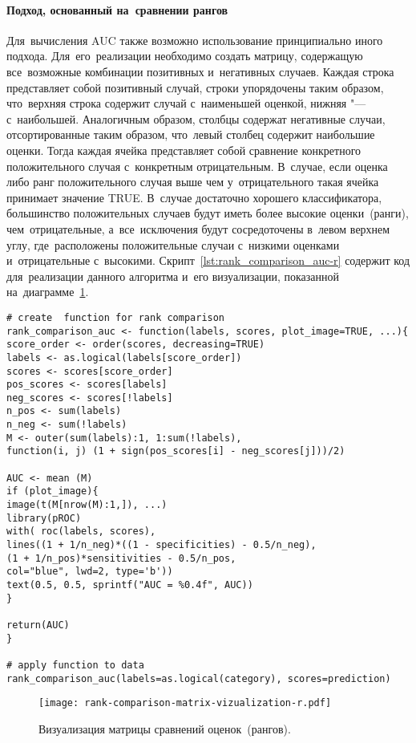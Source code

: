 \documentclass[]{scrreprt}
\begin{document}
\paragraph{Подход, основанный на~сравнении рангов}
Для~вычисления AUC также возможно использование принципиально иного подхода. Для~его~реализации необходимо создать матрицу, содержащую все~возможные комбинации позитивных и~негативных случаев. Каждая строка представляет собой позитивный случай, строки упорядочены таким образом, что~верхняя строка содержит случай с~наименьшей оценкой, нижняя "--- с~наибольшей. Аналогичным образом, столбцы содержат негативные случаи, отсортированные таким образом, что~левый столбец содержит наибольшие оценки. Тогда каждая ячейка представляет собой сравнение конкретного положительного случая с~конкретным отрицательным. В~случае, если оценка либо ранг положительного случая выше чем у~отрицательного такая ячейка принимает значение TRUE. В~случае достаточно хорошего классификатора, большинство положительных случаев будут иметь более высокие оценки~(ранги), чем~отрицательные, а~все~исключения будут сосредоточены в~левом верхнем углу, где~расположены положительные случаи с~низкими оценками и~отрицательные с~высокими. Скрипт~\ref{lst:rank_comparison_auc-r} содержит код для~реализации данного алгоритма и~его визуализации, показанной на~диаграмме~\ref{fig:rank-comparison-matrix-vizualization-r}.
%
\begin{lstlisting}[float, caption = Создание функции для~матрицы сравнений и~её~применение к~тестовым данным, firstnumber=1, label= lst:rank_comparison_auc-r]
# create  function for rank comparison
rank_comparison_auc <- function(labels, scores, plot_image=TRUE, ...){
score_order <- order(scores, decreasing=TRUE)
labels <- as.logical(labels[score_order])
scores <- scores[score_order]
pos_scores <- scores[labels]
neg_scores <- scores[!labels]
n_pos <- sum(labels)
n_neg <- sum(!labels)
M <- outer(sum(labels):1, 1:sum(!labels), 
function(i, j) (1 + sign(pos_scores[i] - neg_scores[j]))/2)

AUC <- mean (M)
if (plot_image){
image(t(M[nrow(M):1,]), ...)
library(pROC)
with( roc(labels, scores),
lines((1 + 1/n_neg)*((1 - specificities) - 0.5/n_neg), 
(1 + 1/n_pos)*sensitivities - 0.5/n_pos, 
col="blue", lwd=2, type='b'))
text(0.5, 0.5, sprintf("AUC = %0.4f", AUC))
}

return(AUC)
}

# apply function to data
rank_comparison_auc(labels=as.logical(category), scores=prediction)
\end{lstlisting}
%
\begin{figure}[ht]
	\centering
	\texttt{[image: rank-comparison-matrix-vizualization-r.pdf]}
	\caption{Визуализация матрицы сравнений оценок~(рангов).}
	\label{fig:rank-comparison-matrix-vizualization-r}
\end{figure}
%
\end{document}
